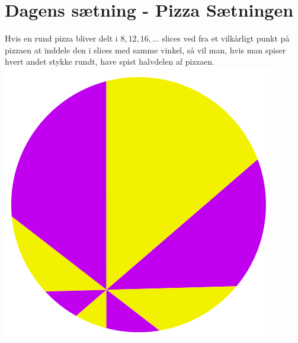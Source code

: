 \begin{minipage}[t]{100mm}
\section*{Dagens sætning - Pizza Sætningen}
Hvis en rund pizza bliver delt i $8, 12, 16, \dots$ slices ved fra et vilkårligt punkt på pizzaen at inddele den i slices med samme vinkel, så vil man, hvis man spiser hvert andet stykke rundt, have spist halvdelen af pizzaen.
\includegraphics[width=\textwidth]{Pizzathm.png}
\end{minipage}

